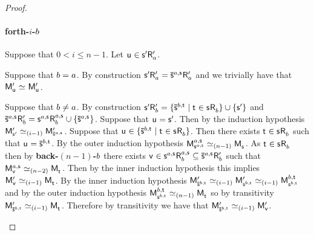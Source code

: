 \begin{proof}
\begin{enumerate}
            \paragraph{forth-$i$-$b$} Suppose that $0 < i \leq n - 1$. Let $\aStateU \in \aStateS[\prime] \aAccessibility[\prime]{\agentA}$. 

            Suppose that $b = a$.
            By construction $\aStateS[\prime] \aAccessibility[\prime]{\agentA} = \aPStateS[\agentA,\aStateS] \aAccessibility[\prime]{\agentA}$ and we trivially have that $\aPModel[\prime]{\aStateU} \bisimilar \aPModel[\prime]{\aStateU}$.

            Suppose that $b \neq a$.
            By construction $\aStateS[\prime] \aAccessibility[\prime]{\agentB} = \{\aPStateS[\agentB,\aStateT] \mid \aStateT \in \aStateS \aAccessibility{\agentB}\} \cup \{\aStateS[\prime]\}$ and $\aPStateS[\agentA,\aStateS] \aAccessibility[\prime]{\agentB} = \aStateS[\agentA,\aStateS] \aAccessibility[\agentA,\aStateS]{\agentB} \cup \{\aPStateS[\agentA,\aStateS]\}$. 
            Suppose that $\aStateU = \aStateS[\prime]$. 
            Then by the induction hypothesis $\aPModel[\prime]{\aStateS[\prime]} \bisimilar[(i-1)] \aPModel[\prime]{\aPStateS[\agentA,\aStateS]}$.
            Suppose that $\aStateU \in \{\aPStateS[\agentB,\aStateT] \mid \aStateT \in \aStateS \aAccessibility{\agentB}\}$. 
            Then there exists $\aStateT \in \aStateS \aAccessibility{\agentB}$ such that $\aStateU = \aPStateS[\agentB,\aStateT]$.
            By the outer induction hypothesis $\aPModel[\agentA,\aStateS]{\aStateS[\agentA,\aStateS]} \bisimilar[(n - 1)] \aPModel{\aStateS}$.
            As $\aStateT \in \aStateS \aAccessibility{\agentB}$ then by {\bf back-$(n-1)$-$b$} there exists $\aStateV \in \aStateS[\agentA,\aStateS] \aAccessibility[\agentA,\aStateS]{\agentB} \subseteq \aPStateS[\agentA,\aStateS] \aAccessibility[\prime]{\agentB}$ such that $\aPModel[\agentA,\aStateS]{\aStateV} \bisimilar[(n - 2)] \aPModel{\aStateT}$.
            Then by the inner induction hypothesis this implies $\aPModel[\prime]{\aStateV} \bisimilar[(i - 1)] \aPModel{\aStateT}$.
            By the inner induction hypothesis $\aPModel[\prime]{\aPStateS[\agentB,\aStateT]} \bisimilar[(i - 1)] \aPModel[\prime]{\aStateS[\agentB,\aStateT]} \bisimilar[(i - 1)] \aPModel[\agentB,\aStateT]{\aStateS[\agentB,\aStateT]}$ and by the outer induction hypothesis $\aPModel[\agentB,\aStateT]{\aStateS[\agentB,\aStateT]} \bisimilar[(n - 1)] \aPModel{\aStateT}$ so by transitivity $\aPModel[\prime]{\aPStateS[\agentB,\aStateT]} \bisimilar[(i - 1)] \aPModel{\aStateT}$.
            Therefore by transitivity we have that $\aPModel[\prime]{\aPStateS[\agentB,\aStateT]} \bisimilar[(i - 1)] \aPModel[\prime]{\aStateV}$.


\end{enumerate}
\end{proof}
